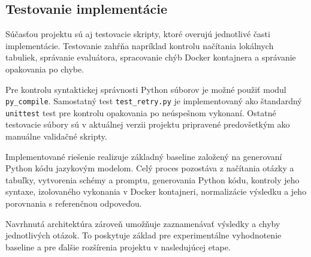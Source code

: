 \subsection{Testovanie implementácie}

Súčasťou projektu sú aj testovacie skripty, ktoré overujú jednotlivé časti
implementácie. Testovanie zahŕňa napríklad kontrolu načítania lokálnych
tabuliek, správanie evaluátora, spracovanie chýb Docker kontajnera a
správanie opakovania po chybe.

Pre kontrolu syntaktickej správnosti Python súborov je možné použiť
modul \texttt{py\_compile}. Samostatný test
\texttt{test\_retry.py} je implementovaný ako štandardný
\texttt{unittest} test pre kontrolu opakovania po neúspešnom vykonaní.
Ostatné testovacie súbory sú v aktuálnej verzii projektu pripravené
predovšetkým ako manuálne validačné skripty.

Implementované riešenie realizuje základný baseline založený na generovaní
Python kódu jazykovým modelom. Celý proces pozostáva z načítania otázky
a tabuľky, vytvorenia schémy a promptu, generovania Python kódu, kontroly
jeho syntaxe, izolovaného vykonania v Docker kontajneri, normalizácie
výsledku a jeho porovnania s referenčnou odpoveďou.

Navrhnutá architektúra zároveň umožňuje zaznamenávať výsledky a chyby
jednotlivých otázok. To poskytuje základ pre experimentálne vyhodnotenie
baseline a pre ďalšie rozšírenia projektu v nasledujúcej etape.